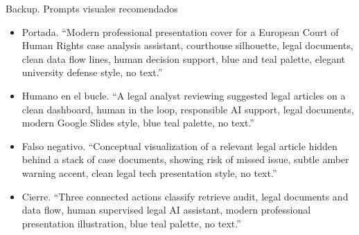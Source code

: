 \documentclass[aspectratio=169,10pt]{beamer}
\begin{document}
\begin{frame}{Backup. Prompts visuales recomendados}
  \small
  \begin{itemize}
    \item Portada. ``Modern professional presentation cover for a European Court of Human Rights case analysis assistant, courthouse silhouette, legal documents, clean data flow lines, human decision support, blue and teal palette, elegant university defense style, no text.''
    \item Humano en el bucle. ``A legal analyst reviewing suggested legal articles on a clean dashboard, human in the loop, responsible AI support, legal documents, modern Google Slides style, blue teal palette, no text.''
    \item Falso negativo. ``Conceptual visualization of a relevant legal article hidden behind a stack of case documents, showing risk of missed issue, subtle amber warning accent, clean legal tech presentation style, no text.''
    \item Cierre. ``Three connected actions classify retrieve audit, legal documents and data flow, human supervised legal AI assistant, modern professional presentation illustration, blue teal palette, no text.''
  \end{itemize}
\end{frame}
\end{document}
